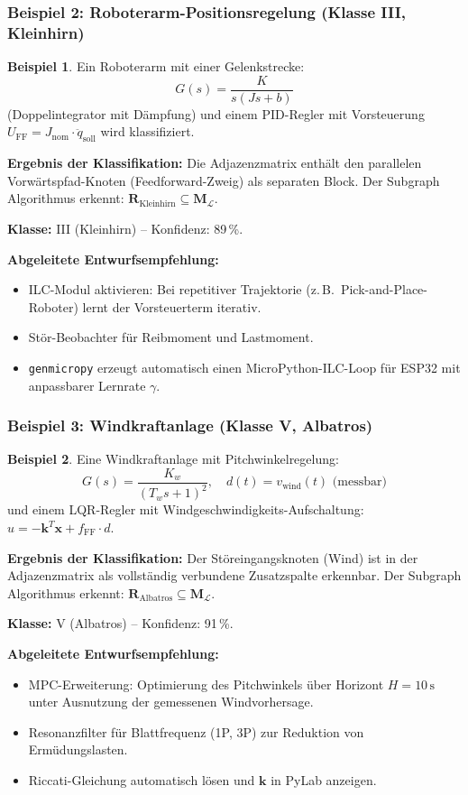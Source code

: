 \documentclass[a4paper,12pt]{article}
\theoremstyle{definition}
\newtheorem{beispiel}{Beispiel}
\begin{document}
\subsubsection{Beispiel 2: Roboterarm-Positionsregelung (Klasse III, Kleinhirn)}

\begin{beispiel}
	Ein Roboterarm mit einer Gelenkstrecke:
	\[
	G(s) = \frac{K}{s(Js + b)}
	\]
	(Doppelintegrator mit Dämpfung) und einem PID-Regler mit Vorsteuerung
	$U_{\mathrm{FF}} = J_{\mathrm{nom}} \cdot \ddot{q}_{\mathrm{soll}}$ wird klassifiziert.
	
	\textbf{Ergebnis der Klassifikation:}
	Die Adjazenzmatrix enthält den parallelen Vorwärtspfad-Knoten
	(Feedforward-Zweig) als separaten Block. Der Subgraph Algorithmus erkennt:
	$\mathbf{R}_{\text{Kleinhirn}} \subseteq \mathbf{M}_\mathcal{L}$.
	
	\textbf{Klasse:} III (Kleinhirn) -- Konfidenz: 89\,\%.
	
	\textbf{Abgeleitete Entwurfsempfehlung:}
	\begin{itemize}
		\item ILC-Modul aktivieren: Bei repetitiver Trajektorie (z.\,B.\
		Pick-and-Place-Roboter) lernt der Vorsteuerterm iterativ.
		\item Stör-Beobachter für Reibmoment und Lastmoment.
		\item \texttt{genmicropy} erzeugt automatisch einen MicroPython-ILC-Loop
		für ESP32 mit anpassbarer Lernrate $\gamma$.
	\end{itemize}
\end{beispiel}

\subsubsection{Beispiel 3: Windkraftanlage (Klasse V, Albatros)}

\begin{beispiel}
	Eine Windkraftanlage mit Pitchwinkelregelung:
	\[
	G(s) = \frac{K_w}{(T_w s + 1)^2}, \quad d(t) = v_{\text{wind}}(t) \text{ (messbar)}
	\]
	und einem LQR-Regler mit Windgeschwindigkeits-Aufschaltung:
	$u = -\mathbf{k}^T \mathbf{x} + f_{\text{FF}} \cdot d$.
	
	\textbf{Ergebnis der Klassifikation:}
	Der Störeingangsknoten (Wind) ist in der Adjazenzmatrix als vollständig
	verbundene Zusatzspalte erkennbar. Der Subgraph Algorithmus erkennt:
	$\mathbf{R}_{\text{Albatros}} \subseteq \mathbf{M}_\mathcal{L}$.
	
	\textbf{Klasse:} V (Albatros) -- Konfidenz: 91\,\%.
	
	\textbf{Abgeleitete Entwurfsempfehlung:}
	\begin{itemize}
		\item MPC-Erweiterung: Optimierung des Pitchwinkels über Horizont
		$H = 10\,\text{s}$ unter Ausnutzung der gemessenen
		Windvorhersage.
		\item Resonanzfilter für Blattfrequenz (1P, 3P) zur Reduktion von
		Ermüdungslasten.
		\item Riccati-Gleichung automatisch lösen und $\mathbf{k}$ in PyLab
		anzeigen.
	\end{itemize}
\end{beispiel}
\end{document}
